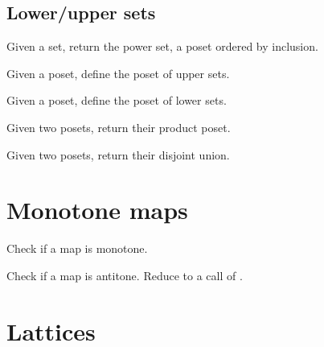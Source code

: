 \subsection{Lower/upper sets}
\begin{exercise}
  Given a set, return the power set, a poset ordered by inclusion.

\end{exercise}

\begin{exercise}
  Given a poset, define the poset of upper sets.

\end{exercise}

\begin{exercise}
  Given a poset, define the poset of lower sets.
\end{exercise}


\begin{exercise}
  Given two posets, return their product poset.
\end{exercise}
\begin{exercise}
  Given two posets, return their disjoint union.

\end{exercise}


\section{Monotone maps}





\begin{exercise}
  Check if a map is monotone.

\end{exercise}

\begin{exercise}
  Check if a map is antitone. Reduce to a call of .

\end{exercise}



\section{Lattices}


